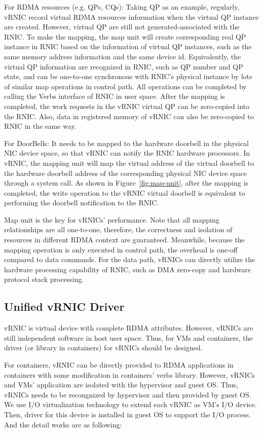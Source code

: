 For RDMA resources (e.g. QPs, CQs): Taking QP as an example, regularly, vRNIC record virtual RDMA resources information when the virtual QP instance are created. However, virtual QP are still not generated-associated with the RNIC. To make the mapping, the map unit will create corresponding real QP instance in RNIC based on the information of virtual QP instances, such as the same memory address information and the same device id. Equivalently, the virtual QP information are recognized in RNIC, such as QP number and QP state, and can be one-to-one synchronous with RNIC’s physical instance by lots of similar map operations in control path. All operations can be completed by calling the Verbs interface of RNIC in user space. After the mapping is completed, the work requests in the vRNIC virtual QP can be zero-copied into the RNIC. Also, data in registered memory of vRNIC can also be zero-copied to RNIC in the same way. 

For DoorBells: It needs to be mapped to the hardware doorbell in the physical NIC device space, so that vRNIC can notify the RNIC hardware processors. In vRNIC, the mapping unit will map the virtual address of the virtual doorbell to the hardware doorbell address of the corresponding physical NIC device space through a system call. As shown in Figure~\ref{fig:map-unit}, after the mapping is completed, the write operation to the vRNIC virtual doorbell is equivalent to performing the doorbell notification to the RNIC.

Map unit is the key for vRNICs' performance. Note that all mapping relationships are all one-to-one, therefore, the correctness and isolation of resources in different RDMA context are guaranteed. Meanwhile, because the mapping operation is only executed in control path, the overhead is one-off compared to data commands. For the data path, vRNICs can directly utilize the hardware processing capability of RNIC, such as DMA zero-copy and hardware protocol stack processing.

\subsection{Unified vRNIC Driver}

vRNIC is virtual device with complete RDMA attributes. However, vRNICs are still independent software in host user space. Thus, for VMs and containers, the driver (or library in containers) for vRNICs should be designed.

For containers, vRNIC can be directly provided to RDMA applications in containers with some modification in containers' verbs library. However, vRNICs  and VMs' application are isolated with the hypervisor and guest OS. Thus, vRNICs needs to be recongnized by hypervisor and then provided by guest OS. We use I/O virtualization technology to extend each vRNIC as VM's I/O device. Then, driver for this device is installed in guest OS to support the I/O process. And the detail works are as following:

